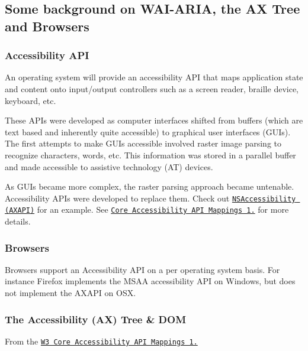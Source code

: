\subsection*{Some background on W\+A\+I-\/\+A\+R\+IA, the AX Tree and Browsers}



\subsubsection*{Accessibility A\+PI}

 An operating system will provide an accessibility A\+PI that maps application state and content onto input/output controllers such as a screen reader, braille device, keyboard, etc.

These A\+P\+Is were developed as computer interfaces shifted from buffers (which are text based and inherently quite accessible) to graphical user interfaces (G\+U\+Is). The first attempts to make G\+U\+Is accessible involved raster image parsing to recognize characters, words, etc. This information was stored in a parallel buffer and made accessible to assistive technology (AT) devices.

As G\+U\+Is became more complex, the raster parsing approach became untenable. Accessibility A\+P\+Is were developed to replace them. Check out \href{https://developer.apple.com/library/mac/documentation/Cocoa/Reference/ApplicationKit/Protocols/NSAccessibility_Protocol/index.html}{\tt N\+S\+Accessibility (A\+X\+A\+PI)} for an example. See \href{https://www.w3.org/TR/core-aam-1.1/}{\tt Core Accessibility A\+PI Mappings 1.} for more details.

\subsubsection*{Browsers}

 Browsers support an Accessibility A\+PI on a per operating system basis. For instance Firefox implements the M\+S\+AA accessibility A\+PI on Windows, but does not implement the A\+X\+A\+PI on O\+SX.

\subsubsection*{The Accessibility (AX) Tree \& D\+OM}

 From the \href{https://www.w3.org/TR/core-aam-1.1/#intro_treetypes}{\tt W3 Core Accessibility A\+PI Mappings 1.}


